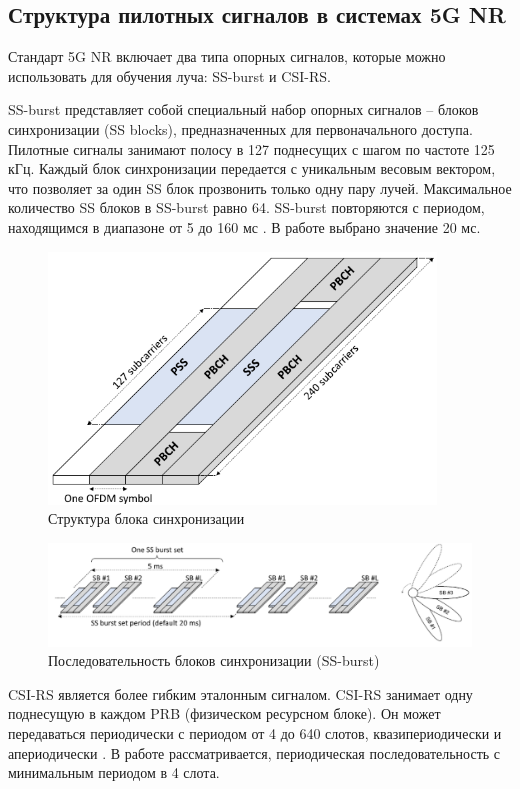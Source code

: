 \subsection{Структура пилотных сигналов в системах 5G NR}
\label{sec:ssburst}



Стандарт 5G NR включает два типа опорных сигналов, которые можно использовать для обучения луча: SS-burst
и CSI-RS.

SS-burst представляет собой специальный набор опорных сигналов -- блоков
синхронизации (SS blocks), предназначенных для первоначального доступа. Пилотные
сигналы занимают полосу в 127 поднесущих с шагом по частоте 125 кГц. 
Каждый блок синхронизации передается с уникальным весовым вектором, что 
позволяет за один SS блок прозвонить только одну пару лучей.  
Максимальное количество SS блоков в SS-burst равно 64. 
SS-burst повторяются с периодом, находящимся  в диапазоне от 5 до 160 мс \cite{Dahlman2018}.  
В работе выбрано значение 20 мс.

\begin{figure}[h!]
    \centering
    \includegraphics[width=0.4\linewidth]{figs/fig4.1}
    \caption{Структура блока синхронизации}
    \label{fig:4.1}
\end{figure}
\begin{figure}[h!]
    \centering
    \includegraphics[width=\linewidth]{figs/fig4.2}
    \caption{Последовательность блоков синхронизации (SS-burst)}
    \label{fig:4.2}
\end{figure}

CSI-RS является более гибким эталонным сигналом. CSI-RS занимает одну поднесущую
в каждом PRB (физическом ресурсном блоке). Он может передаваться периодически
с периодом от 4 до 640 слотов, квазипериодически и
апериодически \cite{Dahlman2018}. 
В работе рассматривается, периодическая последовательность с минимальным периодом
в 4 слота. 

